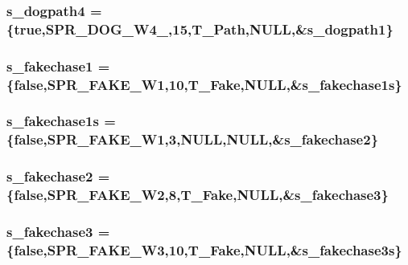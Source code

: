 \label{WL__ACT2_8C_a358e51ea36b7aaa63ab7269544e049f8}
\hypertarget{WL__ACT2_8C_a6f8e4e0307bf9bcad5cc99130e5ba475}{
\subsubsection[{s\_\-dogpath4}]{ {\bf s\_\-dogpath4} = \{true,SPR\_\-DOG\_\-W4\_,15,T\_\-Path,NULL,\&{\bf s\_\-dogpath1}\}}}
\label{WL__ACT2_8C_a6f8e4e0307bf9bcad5cc99130e5ba475}
\hypertarget{WL__ACT2_8C_ad76ee345c327e96e3564960e280e5889}{
\subsubsection[{s\_\-fakechase1}]{ {\bf s\_\-fakechase1} = \{false,SPR\_\-FAKE\_\-W1,10,T\_\-Fake,NULL,\&{\bf s\_\-fakechase1s}\}}}
\label{WL__ACT2_8C_ad76ee345c327e96e3564960e280e5889}
\hypertarget{WL__ACT2_8C_abb19fb284c53f87937af5b503ab73804}{
\subsubsection[{s\_\-fakechase1s}]{ {\bf s\_\-fakechase1s} = \{false,SPR\_\-FAKE\_\-W1,3,NULL,NULL,\&{\bf s\_\-fakechase2}\}}}
\label{WL__ACT2_8C_abb19fb284c53f87937af5b503ab73804}
\hypertarget{WL__ACT2_8C_acfa4d54bff5631c2d75f8920fc6a8892}{
\subsubsection[{s\_\-fakechase2}]{ {\bf s\_\-fakechase2} = \{false,SPR\_\-FAKE\_\-W2,8,T\_\-Fake,NULL,\&{\bf s\_\-fakechase3}\}}}
\label{WL__ACT2_8C_acfa4d54bff5631c2d75f8920fc6a8892}
\hypertarget{WL__ACT2_8C_a7c35860a0338dd90fe8bca8d5edfa5fe}{
\subsubsection[{s\_\-fakechase3}]{ {\bf s\_\-fakechase3} = \{false,SPR\_\-FAKE\_\-W3,10,T\_\-Fake,NULL,\&{\bf s\_\-fakechase3s}\}}}
